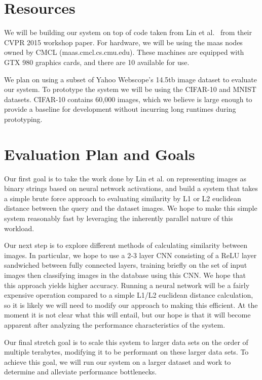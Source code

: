 \section{Resources}
We will be building our system on top of code taken from Lin et al.~\cite{gitrepo} from their CVPR 2015 workshop paper.
For hardware, we will be using the maas nodes owned by CMCL (maas.cmcl.cs.cmu.edu).
These machines are equipped with GTX 980 graphics cards, and there are 10 available for use.

We plan on using a subset of Yahoo Webscope's 14.5tb image dataset to evaluate our system.
To prototype the system we will be using the CIFAR-10 and MNIST datasets.
CIFAR-10 contains 60,000 images, which we believe is large enough to provide a baseline for development
without incurring long runtimes during prototyping.

\section{Evaluation Plan and Goals}

Our first goal is to take the work done by Lin et al. on representing images as binary strings based on neural network activations,
and build a system that takes a simple brute force approach to evaluating similarity by L1 or L2 euclidean distance between the query and the dataset images.
We hope to make this simple system reasonably fast by leveraging the inherently parallel nature of this workload.

Our next step is to explore different methods of calculating similarity between images.
In particular, we hope to use a 2-3 layer CNN consisting of a ReLU layer sandwiched between fully connected layers,
training briefly on the set of input images then classifying images in the database using this CNN.
We hope that this approach yields higher accuracy.
Running a neural network will be a fairly expensive operation compared to a simple L1/L2 euclidean distance calculation,
so it is likely we will need to modify our approach to making this efficient.
At the moment it is not clear what this will entail, but our hope is that it will become apparent after analyzing
the performance characteristics of the system.

Our final stretch goal is to scale this system to larger data sets on the order of multiple terabytes,
modifying it to be performant on these larger data sets.
To achieve this goal, we will run our system on a larger dataset and work to determine and alleviate performance bottlenecks.
